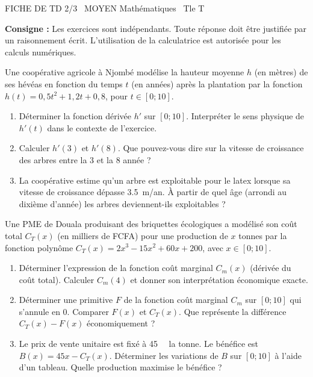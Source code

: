 \documentclass[11pt]{article}
\begin{document}
\begin{tcolorbox}[enhanced,colback=popink,colframe=popink,arc=10pt,boxrule=0pt,left=12pt,right=12pt,top=9pt,bottom=9pt]
{\color{white}\popxbold\small FICHE DE TD 2/3 \textbullet\ MOYEN \hfill Mathématiques \textbullet\ Tle T\par}
\end{tcolorbox}
\vspace{4pt}
\noindent\textbf{Consigne :} Les exercices sont indépendants. Toute réponse doit être justifiée par un raisonnement écrit. L'utilisation de la calculatrice est autorisée pour les calculs numériques.

\begin{exercice}
Une coopérative agricole à Njombé modélise la hauteur moyenne $h$ (en mètres) de ses hévéas en fonction du temps $t$ (en années) après la plantation par la fonction $h(t) = 0,5t^2 + 1,2t + 0,8$, pour $t \in [0; 10]$.
\begin{enumerate}
    \item Déterminer la fonction dérivée $h'$ sur $[0; 10]$. Interpréter le sens physique de $h'(t)$ dans le contexte de l'exercice.
    \item Calculer $h'(3)$ et $h'(8)$. Que pouvez-vous dire sur la vitesse de croissance des arbres entre la 3 et la 8 année ?
    \item La coopérative estime qu'un arbre est exploitable pour le latex lorsque sa vitesse de croissance dépasse \SI{3.5}{m/an}. À partir de quel âge (arrondi au dixième d'année) les arbres deviennent-ils exploitables ?
\end{enumerate}
\end{exercice}

\begin{exercice}
Une PME de Douala produisant des briquettes écologiques a modélisé son coût total $C_T(x)$ (en milliers de FCFA) pour une production de $x$ tonnes par la fonction polynôme $C_T(x) = 2x^3 - 15x^2 + 60x + 200$, avec $x \in [0; 10]$.
\begin{enumerate}
    \item Déterminer l'expression de la fonction coût marginal $C_m(x)$ (dérivée du coût total). Calculer $C_m(4)$ et donner son interprétation économique exacte.
    \item Déterminer une primitive $F$ de la fonction coût marginal $C_m$ sur $[0; 10]$ qui s'annule en $0$. Comparer $F(x)$ et $C_T(x)$. Que représente la différence $C_T(x) - F(x)$ économiquement ?
    \item Le prix de vente unitaire est fixé à \SI{45}{\kilo{}} la tonne. Le bénéfice est $B(x) = 45x - C_T(x)$. Déterminer les variations de $B$ sur $[0; 10]$ à l'aide d'un tableau. Quelle production maximise le bénéfice ?
\end{enumerate}
\end{exercice}
\end{document}
